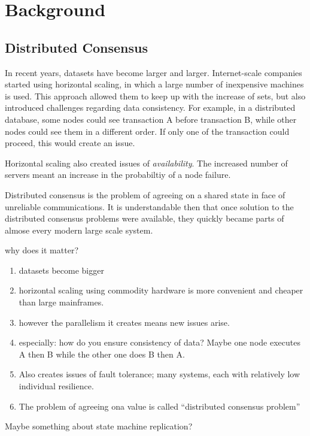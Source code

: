 \chapter{Background}

\section{Distributed Consensus}

In recent years, datasets have become larger and larger.
Internet-scale companies started using horizontal scaling, in which a large number of inexpensive machines is used.
This approach allowed them to keep up with the increase of sets, but also introduced challenges regarding data consistency.
For example, in a distributed database, some nodes could see transaction A before transaction B, while other nodes could see them in a different order.
If only one of the transaction could proceed, this would create an issue.

Horizontal scaling also created issues of \emph{availability}.
The increased number of servers meant an increase in the probabiltiy of a node failure.

Distributed consensus is the problem of agreeing on a shared state in face of unreliable communications.
It is understandable then that once solution to the distributed consensus problems were available, they quickly became parts of almose every modern large scale system.

why does it matter?

\begin{enumerate}
    \item datasets become bigger 
    \item horizontal scaling using commodity hardware is more convenient and cheaper than large mainframes.
    \item however the parallelism it creates means new issues arise.
    \item especially: how do you ensure consistency of data?
        Maybe one node executes A then B while the other one does B then A.
    \item Also creates issues of fault tolerance; many systems, each with relatively low individual resilience.
    \item The problem of agreeing ona value is called ``distributed consensus problem''
\end{enumerate}

Maybe something about state machine replication?


